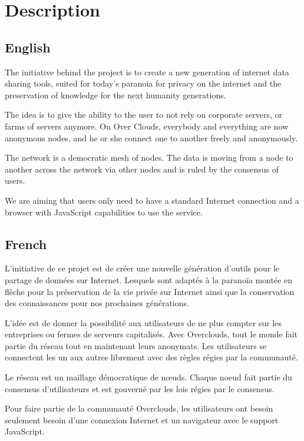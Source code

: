 \section{Description}

\subsection{English}
The initiative behind the project is to create a new generation of internet data sharing tools, suited for today's paranoia for privacy on the internet and the preservation of knowledge for the next humanity generations.

The idea is to give the ability to the user to not rely on corporate servers, or farms of servers anymore. On Over Clouds, everybody and everything are now anonymous nodes, and he or she connect one to another freely and anonymously.

The network is a democratic mesh of nodes. The data is moving from a node to another across the network via other nodes and is ruled by the consensus of users.

We are aiming that users only need to have a standard Internet connection and a browser with JavaScript capabilities to use the service.

\subsection{French}
L'initiative de ce projet est de créer une nouvelle génération d'outils pour le partage de données sur Internet. Lesquels sont adaptés à la paranoïa montée en flèche pour la préservation de la vie privée sur Internet ainsi que la conservation des connaissances pour nos prochaines générations.

L'idée est de donner la possibilité aux utilisateurs de ne plus compter sur les entreprises ou fermes de serveurs capitalisés. Avec Overclouds, tout le monde fait partie du réseau tout en maintenant leurs anonymats. Les utilisateurs se connectent les un aux autres librement avec des règles régies par la communauté.

Le réseau est un maillage démocratique de nœuds. Chaque noeud fait partie du consensus d’utilisateurs et est gouverné par les lois régies par le consensus. 


Pour faire partie de la communauté Overclouds, les utilisateurs ont besoin seulement besoin d’une connexion Internet et un navigateur avec le support JavaScript.

